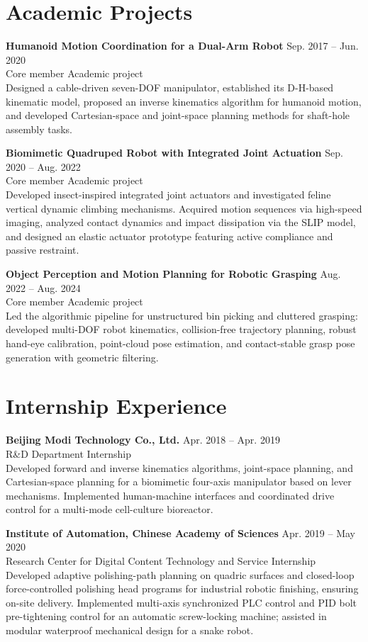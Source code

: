\documentclass[11pt,a4paper]{article}
\newcommand{\entry}[4]{%
  \textbf{#1} \hfill #2\\
  {\color{textgray}#3} \hfill {#4}\\[-2pt]
}
\begin{document}
\section*{Academic Projects}
\entry{Humanoid Motion Coordination for a Dual-Arm Robot}{Sep. 2017 -- Jun. 2020}{Core member}{Academic project}
Designed a cable-driven seven-DOF manipulator, established its D-H-based kinematic model, proposed an inverse kinematics algorithm for humanoid motion, and developed Cartesian-space and joint-space planning methods for shaft-hole assembly tasks.

\entry{Biomimetic Quadruped Robot with Integrated Joint Actuation}{Sep. 2020 -- Aug. 2022}{Core member}{Academic project}
Developed insect-inspired integrated joint actuators and investigated feline vertical dynamic climbing mechanisms. Acquired motion sequences via high-speed imaging, analyzed contact dynamics and impact dissipation via the SLIP model, and designed an elastic actuator prototype featuring active compliance and passive restraint.

\entry{Object Perception and Motion Planning for Robotic Grasping}{Aug. 2022 -- Aug. 2024}{Core member}{Academic project}
Led the algorithmic pipeline for unstructured bin picking and cluttered grasping: developed multi-DOF robot kinematics, collision-free trajectory planning, robust hand-eye calibration, point-cloud pose estimation, and contact-stable grasp pose generation with geometric filtering.

\section*{Internship Experience}
\entry{Beijing Modi Technology Co., Ltd.}{Apr. 2018 -- Apr. 2019}{R\&D Department}{Internship}
Developed forward and inverse kinematics algorithms, joint-space planning, and Cartesian-space planning for a biomimetic four-axis manipulator based on lever mechanisms. Implemented human-machine interfaces and coordinated drive control for a multi-mode cell-culture bioreactor.

\entry{Institute of Automation, Chinese Academy of Sciences}{Apr. 2019 -- May 2020}{Research Center for Digital Content Technology and Service}{Internship}
Developed adaptive polishing-path planning on quadric surfaces and closed-loop force-controlled polishing head programs for industrial robotic finishing, ensuring on-site delivery. Implemented multi-axis synchronized PLC control and PID bolt pre-tightening control for an automatic screw-locking machine; assisted in modular waterproof mechanical design for a snake robot.
\end{document}
